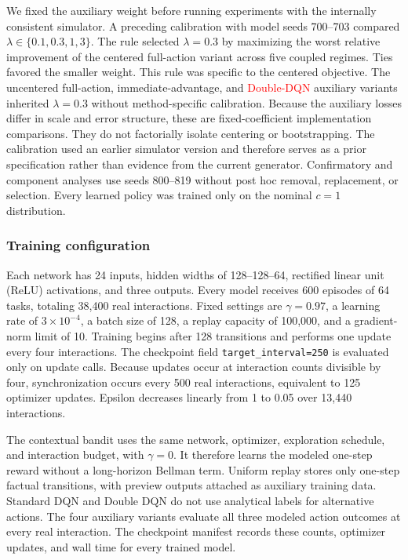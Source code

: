 \documentclass[remotesensing,article,submit,moreauthors]{Definitions/mdpi}
\newcommand{\revised}[1]{\textcolor{red}{#1}}
\newcommand{\revised}[1]{#1}
\begin{document}
We fixed the auxiliary weight before running experiments with the internally consistent simulator. A preceding calibration with model seeds 700--703 compared $\lambda\in\{0.1,0.3,1,3\}$. The rule selected $\lambda=0.3$ by maximizing the worst relative improvement of the centered full-action variant across five coupled regimes. Ties favored the smaller weight. This rule was specific to the centered objective. The uncentered full-action, immediate-advantage, and \revised{Double-DQN} auxiliary variants inherited $\lambda=0.3$ without method-specific calibration. Because the auxiliary losses differ in scale and error structure, these are fixed-coefficient implementation comparisons. They do not factorially isolate centering or bootstrapping. The calibration used an earlier simulator version and therefore serves as a prior specification rather than evidence from the current generator. Confirmatory and component analyses use seeds 800--819 without post hoc removal, replacement, or selection. Every learned policy was trained only on the nominal $c=1$ distribution.

\subsubsection{Training configuration}

Each network has 24 inputs, hidden widths of 128--128--64, rectified linear unit (ReLU) activations, and three outputs. Every model receives 600 episodes of 64 tasks, totaling 38,400 real interactions. Fixed settings are $\gamma=0.97$, a learning rate of $3\times10^{-4}$, a batch size of 128, a replay capacity of 100,000, and a gradient-norm limit of 10. Training begins after 128 transitions and performs one update every four interactions. The checkpoint field \texttt{target\_interval=250} is evaluated only on update calls. Because updates occur at interaction counts divisible by four, synchronization occurs every 500 real interactions, equivalent to 125 optimizer updates. Epsilon decreases linearly from 1 to 0.05 over 13,440 interactions.

The contextual bandit uses the same network, optimizer, exploration schedule, and interaction budget, with $\gamma=0$. It therefore learns the modeled one-step reward without a long-horizon Bellman term. Uniform replay stores only one-step factual transitions, with preview outputs attached as auxiliary training data. Standard DQN and Double DQN do not use analytical labels for alternative actions. The four auxiliary variants evaluate all three modeled action outcomes at every real interaction. The checkpoint manifest records these counts, optimizer updates, and wall time for every trained model.
\end{document}
